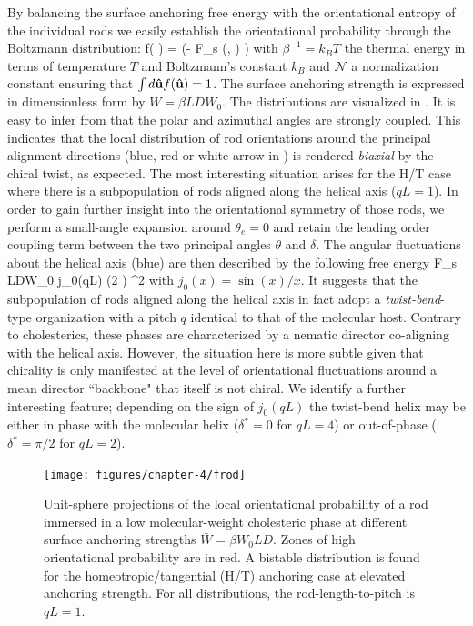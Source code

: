 By balancing the surface anchoring free energy with the orientational entropy of the individual rods we easily establish the orientational probability through the Boltzmann distribution:
  \beq
  f( \bhu ) =  \exp (- \beta F_{s} (\delta, \theta)  )
  \label{fsingle}
  \eeq
 with $\beta^{-1} = k_{B}T$ the thermal energy in terms of temperature $T$ and Boltzmann's constant $k_{B}$ and $\mathcal{N}$ a normalization constant ensuring that $\int d {\bf \hat{u}} f({\bf \hat{u}}) = 1$.  The surface anchoring strength is expressed  in dimensionless form by $\bar{W} = \beta LDW_{0}$.  The distributions are visualized in .
It is easy to infer from  that the polar and azimuthal angles are strongly coupled. This indicates that the local distribution of rod orientations around the principal alignment directions (blue, red or white arrow in ) is rendered {\em biaxial} by the chiral twist, as expected.  The most interesting situation arises for the H/T case where there is a subpopulation of  rods aligned along the helical axis ($qL=1$). In order to gain further insight into the orientational symmetry of those rods, we perform a small-angle expansion around   $\theta_{e} = 0$ and retain the leading order coupling term between the two principal angles $\theta$ and $\delta$. The angular fluctuations about the helical axis (blue) are then described by the following free energy
\beq
F_{s} \approx {} LDW_{0}  j_{0}(qL) \cos (2 \delta) \theta^{2}
\label{ht_fluc_new}
\eeq
with $j_{0}(x) = \sin (x)/x$. It suggests that the subpopulation of rods aligned along the helical axis in fact adopt a {\em twist-bend}-type organization with a pitch $q$ identical to that of the molecular host. Contrary to cholesterics, these phases are characterized by a nematic director co-aligning with the helical axis. However, the situation here is more subtle given that  chirality is only manifested at the level of orientational fluctuations around a mean director ``backbone" that itself is not chiral.   We  identify a further interesting feature; depending on the sign of $j_{0}(qL)$ the twist-bend helix may be either in phase with the molecular helix ($\delta^{\ast} =0$ for  $qL=4$) or out-of-phase ($\delta^{\ast} = \pi/2$ for $qL=2$).


  \begin{figure}
	\texttt{[image: figures/chapter-4/frod]}
	\caption{ Unit-sphere projections of the local orientational probability of a rod immersed in a low molecular-weight cholesteric phase at different surface anchoring strengths $\bar{W} = \beta W_{0}LD$. Zones of high orientational probability are in red.  A bistable distribution is found for the homeotropic/tangential (H/T) anchoring case at elevated anchoring strength. For all distributions, the rod-length-to-pitch is $qL=1$. }
	\label{frod}
\end{figure}




